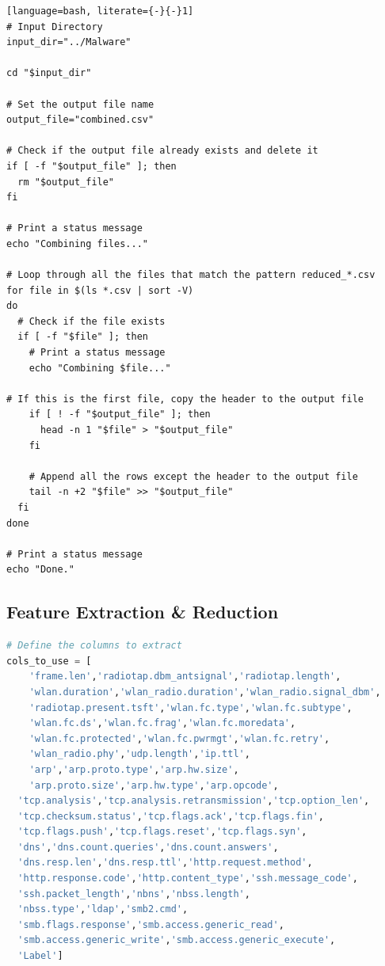 \begin{appendices}
\begin{lstlisting}[language=bash, literate={-}{-}1]
# Input Directory
input_dir="../Malware"

cd "$input_dir"

# Set the output file name
output_file="combined.csv"

# Check if the output file already exists and delete it
if [ -f "$output_file" ]; then
  rm "$output_file"
fi

# Print a status message
echo "Combining files..."

# Loop through all the files that match the pattern reduced_*.csv
for file in $(ls *.csv | sort -V)
do
  # Check if the file exists
  if [ -f "$file" ]; then
    # Print a status message
    echo "Combining $file..."

# If this is the first file, copy the header to the output file
    if [ ! -f "$output_file" ]; then
      head -n 1 "$file" > "$output_file"
    fi

    # Append all the rows except the header to the output file
    tail -n +2 "$file" >> "$output_file"
  fi
done

# Print a status message
echo "Done."
\end{lstlisting}

\newpage
\subsection{Feature Extraction \& Reduction}
\label{appx: Feature Extraction}

\begin{lstlisting}[language=Python]
# Define the columns to extract
cols_to_use = [
	'frame.len','radiotap.dbm_antsignal','radiotap.length', 
	'wlan.duration','wlan_radio.duration','wlan_radio.signal_dbm', 
	'radiotap.present.tsft','wlan.fc.type','wlan.fc.subtype', 
	'wlan.fc.ds','wlan.fc.frag','wlan.fc.moredata',
	'wlan.fc.protected','wlan.fc.pwrmgt','wlan.fc.retry',
	'wlan_radio.phy','udp.length','ip.ttl',
	'arp','arp.proto.type','arp.hw.size',
	'arp.proto.size','arp.hw.type','arp.opcode',
  'tcp.analysis','tcp.analysis.retransmission','tcp.option_len',
  'tcp.checksum.status','tcp.flags.ack','tcp.flags.fin',
  'tcp.flags.push','tcp.flags.reset','tcp.flags.syn',
  'dns','dns.count.queries','dns.count.answers',
  'dns.resp.len','dns.resp.ttl','http.request.method',
  'http.response.code','http.content_type','ssh.message_code',
  'ssh.packet_length','nbns','nbss.length',
  'nbss.type','ldap','smb2.cmd',
  'smb.flags.response','smb.access.generic_read',
  'smb.access.generic_write','smb.access.generic_execute',
  'Label']


\end{lstlisting}
\end{appendices}
